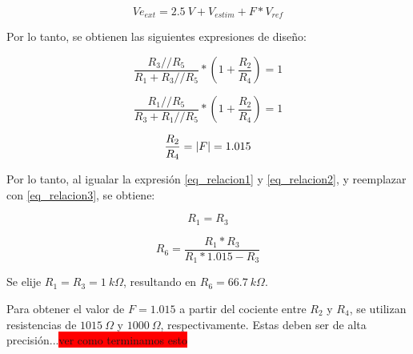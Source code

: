 \begin{equation*} 
	Ve_{ext}= 2.5\:V + V_{estim} + F*V_{ref}
\end{equation*}

Por lo tanto, se obtienen las siguientes expresiones de diseño:


\begin{equation} \label{eq_relacion1}
	\frac{R_3//R_5}{R_1+R_3//R_5}*(1+\frac{R_2}{R_4})=1
\end{equation}

\begin{equation} \label{eq_relacion2}
	\frac{R_1//R_5}{R_3+R_1//R_5}*(1+\frac{R_2}{R_4})=1
\end{equation}

\begin{equation} \label{eq_relacion3} 
	\frac{R_2}{R_4}=\lvert F\rvert=1.015
\end{equation}

Por lo tanto, al igualar la expresión \ref{eq_relacion1} y \ref{eq_relacion2}, y reemplazar con \ref{eq_relacion3}, se obtiene:

\begin{equation*} 
	R_1 = R_3
\end{equation*}

\begin{equation*} 
	R_6=\frac{R_1*R_3}{R_1*1.015-R_3}
\end{equation*}

Se elije $R_1=R_3=1\:k\Omega$, resultando en $R_6=66.7\:k\Omega$.

Para obtener el valor de $F=1.015$ a partir del cociente entre  $R_2$  y $R_4$, se utilizan resistencias de $1015\:\Omega$ y $1000\:\Omega$, respectivamente. Estas deben ser de alta precisión...\colorbox{red}{ver como terminamos esto}
